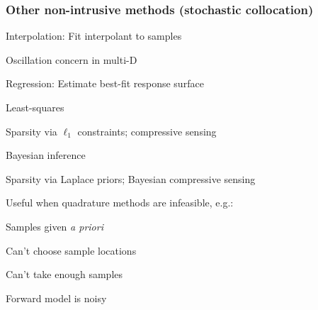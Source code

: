  



 
\begin{frame}[t] 
\label{non-intrusive-other}
\frametitle{Other non-intrusive methods (stochastic collocation)}

\bi
\item Interpolation: Fit interpolant to samples
\bi\item Oscillation concern in multi-D\ei
\medskip
\item Regression: Estimate best-fit response surface 
\bi
\item Least-squares 
\bi\item Sparsity via $\ell_1$ constraints; compressive sensing\ei
\item Bayesian inference 
\bi\item Sparsity via Laplace priors; Bayesian compressive sensing\ei
\item Useful when quadrature methods are infeasible, e.g.:
\bdi
\item Samples given \emph{a priori}
\item Can't choose sample locations 
\item Can't take enough samples
\item Forward model is noisy
\edi
\ei
\ei
\end{frame}
